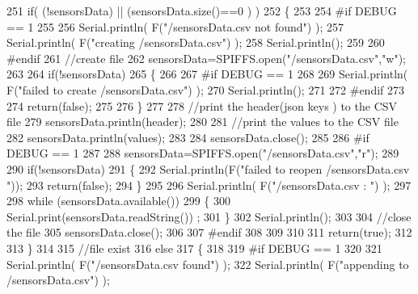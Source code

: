 \begin{DoxyCode}
251     \textcolor{keywordflow}{if}( (!sensorsData) || (sensorsData.size()==0 ) )
252     \{
253     
254 \textcolor{preprocessor}{    #if DEBUG == 1}
255     
256         Serial.println( F(\textcolor{stringliteral}{"/sensorsData.csv not found"}) );
257         Serial.println( F(\textcolor{stringliteral}{"creating /sensorsData.csv"}) );
258         Serial.println();
259     
260 \textcolor{preprocessor}{    #endif}
261         \textcolor{comment}{//create file}
262         sensorsData=SPIFFS.open(\textcolor{stringliteral}{"/sensorsData.csv"},\textcolor{stringliteral}{"w"});
263         
264         \textcolor{keywordflow}{if}(!sensorsData)
265         \{
266 
267 \textcolor{preprocessor}{        #if DEBUG == 1}
268         
269             Serial.println( F(\textcolor{stringliteral}{"failed to create /sensorsData.csv"}) );
270             Serial.println();
271         
272 \textcolor{preprocessor}{        #endif}
273         
274             \textcolor{keywordflow}{return}(\textcolor{keyword}{false});
275 
276         \}
277         
278         \textcolor{comment}{//print the header(json keys ) to the CSV file}
279         sensorsData.println(header);
280 
281         \textcolor{comment}{//print the values to the CSV file}
282         sensorsData.println(values);
283         
284         sensorsData.close();
285     
286 \textcolor{preprocessor}{    #if DEBUG == 1}
287 
288         sensorsData=SPIFFS.open(\textcolor{stringliteral}{"/sensorsData.csv"},\textcolor{stringliteral}{"r"});
289         
290         \textcolor{keywordflow}{if}(!sensorsData)
291         \{
292             Serial.println(F(\textcolor{stringliteral}{"failed to reopen /sensorsData.csv "}));
293             \textcolor{keywordflow}{return}(\textcolor{keyword}{false});      
294         \}
295 
296         Serial.println( F(\textcolor{stringliteral}{"/sensorsData.csv : "}) );
297 
298         \textcolor{keywordflow}{while} (sensorsData.available()) 
299         \{
300             Serial.print(sensorsData.readString()) ;
301         \}
302         Serial.println();
303 
304         \textcolor{comment}{//close the file}
305         sensorsData.close();
306 
307 \textcolor{preprocessor}{    #endif}
308         
309 
310         
311         \textcolor{keywordflow}{return}(\textcolor{keyword}{true});
312         
313     \}
314 
315     \textcolor{comment}{//file exist}
316     \textcolor{keywordflow}{else}
317     \{
318 
319 \textcolor{preprocessor}{    #if DEBUG == 1}
320     
321         Serial.println( F(\textcolor{stringliteral}{"/sensorsData.csv  found"}) );
322         Serial.println( F(\textcolor{stringliteral}{"appending to /sensorsData.csv"}) );

\end{DoxyCode}
